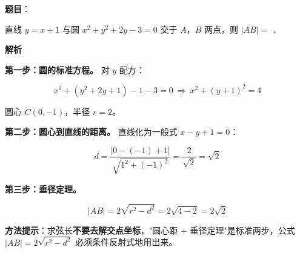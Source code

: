 \begin{answer}

\textbf{题目}：

直线 $y=x+1$ 与圆 $x^{2}+y^{2}+2y-3=0$ 交于 $A$，$B$ 两点，则 $|AB|=$ \gkblank{}．

\textbf{解析}

\textbf{第一步：圆的标准方程。} 对 $y$ 配方：

\nopagebreak[4]
\[x^{2}+\left(y^{2}+2y+1\right)-1-3=0\ \Longrightarrow\ x^{2}+(y+1)^{2}=4\]

圆心 $C(0,-1)$，半径 $r=2$。

\textbf{第二步：圆心到直线的距离。} 直线化为一般式 $x-y+1=0$：

\nopagebreak[4]
\[d=\frac{|0-(-1)+1|}{\sqrt{1^{2}+(-1)^{2}}}=\frac2{\sqrt2}=\sqrt2\]

\textbf{第三步：垂径定理。}

\nopagebreak[4]
\[|AB|=2\sqrt{r^{2}-d^{2}}=2\sqrt{4-2}=2\sqrt2\]

\begin{gktip}
\textbf{方法提示}：求弦长\textbf{不要去解交点坐标}，"圆心距 + 垂径定理"是标准两步，公式 $|AB|=2\sqrt{r^{2}-d^{2}}$ 必须条件反射式地用出来。
\end{gktip}


\par\medskip

\end{answer}
